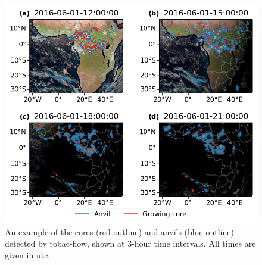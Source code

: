 \begin{figure}[t]
    \includegraphics[width=\textwidth]{figures/ch3_04.png}
    \caption[
    An example of the cores and anvils (detected by tobac-flow, shown at 3-hour time intervals
    ]{
    An example of the cores (red outline) and anvils (blue outline) detected by tobac-flow, shown at 3-hour time intervals. All times are given in \acrshort{utc}.
    }
    \label{fig:seviri_detection}
\end{figure}


